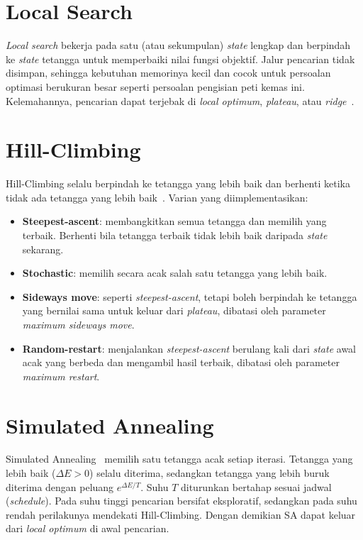 \section{Local Search}

\textit{Local search} bekerja pada satu (atau sekumpulan) \textit{state} lengkap dan
berpindah ke \textit{state} tetangga untuk memperbaiki nilai fungsi objektif. Jalur
pencarian tidak disimpan, sehingga kebutuhan memorinya kecil dan cocok untuk
persoalan optimasi berukuran besar seperti persoalan pengisian peti kemas ini.
Kelemahannya, pencarian dapat terjebak di \textit{local optimum}, \textit{plateau},
atau \textit{ridge}~\cite{russell2010aima,khodra2021localsearch}.

\section{Hill-Climbing}

Hill-Climbing selalu berpindah ke tetangga yang lebih baik dan berhenti ketika tidak
ada tetangga yang lebih baik~\cite{russell2010aima,khodra2021hc}. Varian yang
diimplementasikan:
\begin{itemize}
	\item \textbf{Steepest-ascent}: membangkitkan semua tetangga dan memilih yang terbaik.
	Berhenti bila tetangga terbaik tidak lebih baik daripada \textit{state} sekarang.
	\item \textbf{Stochastic}: memilih secara acak salah satu tetangga yang lebih baik.
	\item \textbf{Sideways move}: seperti \textit{steepest-ascent}, tetapi boleh berpindah ke
	tetangga yang bernilai sama untuk keluar dari \textit{plateau}, dibatasi oleh
	parameter \textit{maximum sideways move}.
	\item \textbf{Random-restart}: menjalankan \textit{steepest-ascent} berulang kali dari
	\textit{state} awal acak yang berbeda dan mengambil hasil terbaik, dibatasi oleh
	parameter \textit{maximum restart}.
\end{itemize}

\section{Simulated Annealing}

Simulated Annealing~\cite{kirkpatrick1983sa,khodra2021sa} memilih satu tetangga acak
setiap iterasi. Tetangga yang lebih baik ($\Delta E>0$) selalu diterima, sedangkan
tetangga yang lebih buruk diterima dengan peluang $e^{\Delta E/T}$. Suhu $T$
diturunkan bertahap sesuai jadwal (\textit{schedule}). Pada suhu tinggi pencarian
bersifat eksploratif, sedangkan pada suhu rendah perilakunya mendekati Hill-Climbing.
Dengan demikian SA dapat keluar dari \textit{local optimum} di awal pencarian.

